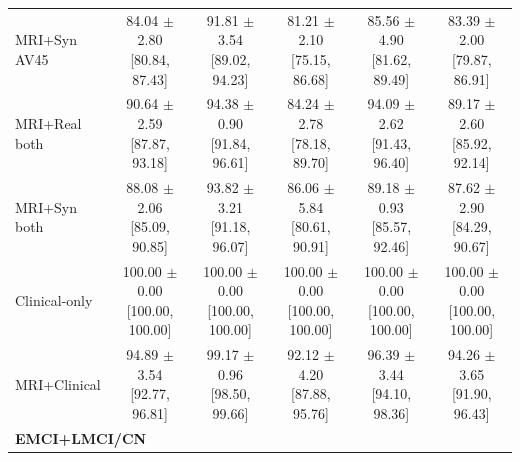 \documentclass{article}
\begin{document}
\begin{landscape}
\begin{longtable}{lccccc}
MRI+Syn AV45 & \shortstack{84.04 $\pm$ 2.80\\{}[80.84, 87.43]} & \shortstack{91.81 $\pm$ 3.54\\{}[89.02, 94.23]} & \shortstack{81.21 $\pm$ 2.10\\{}[75.15, 86.68]} & \shortstack{85.56 $\pm$ 4.90\\{}[81.62, 89.49]} & \shortstack{83.39 $\pm$ 2.00\\{}[79.87, 86.91]} \\
MRI+Real both & \shortstack{90.64 $\pm$ 2.59\\{}[87.87, 93.18]} & \shortstack{94.38 $\pm$ 0.90\\{}[91.84, 96.61]} & \shortstack{84.24 $\pm$ 2.78\\{}[78.18, 89.70]} & \shortstack{94.09 $\pm$ 2.62\\{}[91.43, 96.40]} & \shortstack{89.17 $\pm$ 2.60\\{}[85.92, 92.14]} \\
MRI+Syn both & \shortstack{88.08 $\pm$ 2.06\\{}[85.09, 90.85]} & \shortstack{93.82 $\pm$ 3.21\\{}[91.18, 96.07]} & \shortstack{86.06 $\pm$ 5.84\\{}[80.61, 90.91]} & \shortstack{89.18 $\pm$ 0.93\\{}[85.57, 92.46]} & \shortstack{87.62 $\pm$ 2.90\\{}[84.29, 90.67]} \\
Clinical-only & \shortstack{100.00 $\pm$ 0.00\\{}[100.00, 100.00]} & \shortstack{100.00 $\pm$ 0.00\\{}[100.00, 100.00]} & \shortstack{100.00 $\pm$ 0.00\\{}[100.00, 100.00]} & \shortstack{100.00 $\pm$ 0.00\\{}[100.00, 100.00]} & \shortstack{100.00 $\pm$ 0.00\\{}[100.00, 100.00]} \\
MRI+Clinical & \shortstack{94.89 $\pm$ 3.54\\{}[92.77, 96.81]} & \shortstack{99.17 $\pm$ 0.96\\{}[98.50, 99.66]} & \shortstack{92.12 $\pm$ 4.20\\{}[87.88, 95.76]} & \shortstack{96.39 $\pm$ 3.44\\{}[94.10, 98.36]} & \shortstack{94.26 $\pm$ 3.65\\{}[91.90, 96.43]} \\
\midrule
\multicolumn{6}{l}{\textbf{EMCI+LMCI/CN}} \\

\end{longtable}
\end{landscape}
\end{document}

